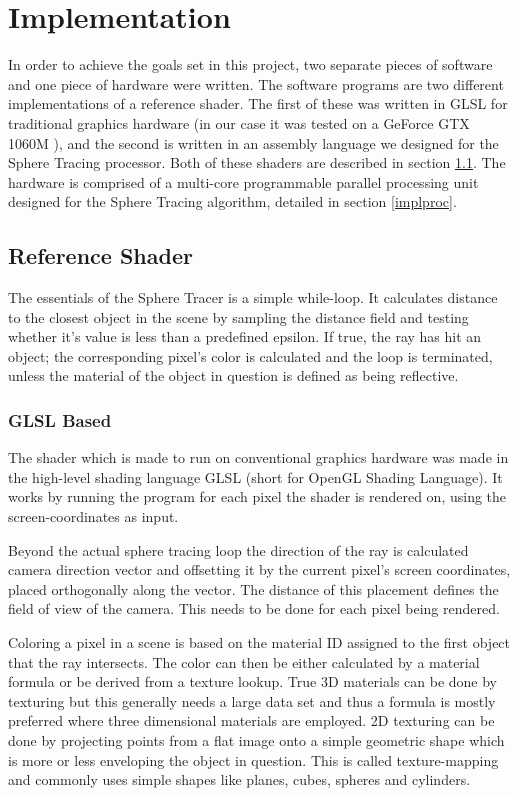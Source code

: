 \chapter{Implementation}

	In order to achieve the goals set in this project, two separate pieces of 
	software and one piece of hardware were written. The software programs are 
	two different implementations of a reference shader. The first of these was 
	written in GLSL for traditional graphics hardware (in our case it was 
	tested on a GeForce GTX 1060M ), and the second is written in an assembly 
	language we designed for the Sphere Tracing processor. Both of these 
	shaders are described in section \ref{implshader}. The hardware is 
	comprised of a multi-core programmable parallel processing unit designed 
	for the Sphere Tracing algorithm, detailed in section \ref{implproc}.

	\section{Reference Shader} \label{implshader}

		The essentials of the Sphere Tracer is a simple while-loop. It
		calculates distance to the closest object in the scene by sampling
		the distance field and testing whether it's value is less than a
		predefined epsilon. If true, the ray has hit an object; the
		corresponding pixel's color is calculated and the loop is
		terminated, unless the material of the object in question is
		defined as being reflective.

		\subsection{GLSL Based}

			The shader which is made to run on conventional graphics hardware
			was made in the high-level shading language GLSL (short for OpenGL
			Shading Language). It works by running the program for each pixel
			the shader is rendered on, using the screen-coordinates as input.

			Beyond the actual sphere tracing loop the direction of the ray is
			calculated camera direction vector and offsetting it by the current 
			pixel's screen coordinates, placed orthogonally along the vector.
			The distance of this placement defines the field of view of the 
			camera. This needs to be done for each pixel being rendered.

			Coloring a pixel in a scene is based on the material ID
			assigned to the first object that the ray intersects. The color
			can then be either calculated by a material formula or be 
			derived from a texture lookup. True 3D materials can be done by
			texturing but this generally needs a large data set and thus a 
			formula is mostly preferred where three dimensional materials 
			are employed. 2D texturing can be done by projecting points from
			a flat image onto a simple geometric shape  which is more or less 
			enveloping the object in question. This is called texture-mapping 
			and commonly uses simple shapes like planes, cubes, spheres and 
			cylinders. 

